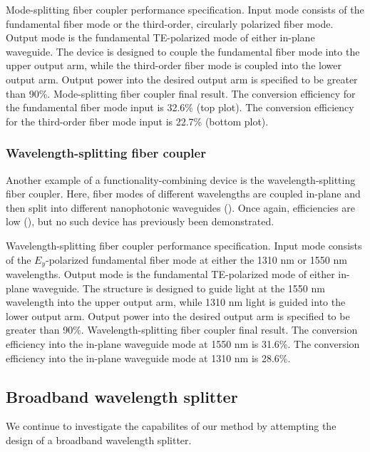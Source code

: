 \documentclass[letterpaper,10pt]{article}
\begin{document}
    {Mode-splitting fiber coupler performance specification.
    Input mode consists of the fundamental fiber mode or 
        the third-order, circularly polarized fiber mode.
    Output mode is the fundamental TE-polarized mode of either in-plane waveguide.
    The device is designed to couple the fundamental fiber mode into
        the upper output arm, 
        while the third-order fiber mode is coupled into the lower output arm.
    Output power into the desired output arm is specified to be greater than 90\%.}
    {Mode-splitting fiber coupler final result.
    The conversion efficiency for the fundamental fiber mode input is 32.6\% 
        (top plot).
    The conversion efficiency for the third-order fiber mode input is 22.7\% 
        (bottom plot).}

\subsubsection{Wavelength-splitting fiber coupler}
Another example of a functionality-combining device is the wavelength-splitting
    fiber coupler.
Here, fiber modes of different wavelengths are coupled in-plane
    and then split into different nanophotonic waveguides ().
Once again, efficiencies are low (),
    but no such device has previously been demonstrated.

    {Wavelength-splitting fiber coupler performance specification.
    Input mode consists of the $E_y$-polarized fundamental fiber mode at either
        the 1310 nm or 1550 nm wavelengths.
    Output mode is the fundamental TE-polarized mode of either in-plane waveguide.
    The structure is designed to guide light at the 1550 nm wavelength
        into the upper output arm,
        while 1310 nm light is guided into the lower output arm.
    Output power into the desired output arm is specified to be greater than 90\%.}
    {Wavelength-splitting fiber coupler final result.
    The conversion efficiency into the in-plane waveguide mode at 1550 nm is 31.6\%.
    The conversion efficiency into the in-plane waveguide mode at 1310 nm is 28.6\%.}

\subsection{Broadband wavelength splitter}
We continue to investigate the capabilites of our method
    by attempting the design of a broadband wavelength splitter.
\end{document}
